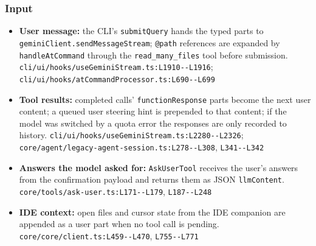 \subsubsection*{Input}
\begin{itemize}
\item \textbf{User message:} the CLI's \texttt{submitQuery} hands the typed parts to \texttt{geminiClient.\allowbreak{}sendMessageStream}; \texttt{@path} references are expanded by \texttt{handleAtCommand} through the \texttt{read\_\allowbreak{}many\_\allowbreak{}files} tool before submission. \texttt{cli/\allowbreak{}ui/\allowbreak{}hooks/\allowbreak{}useGeminiStream.\allowbreak{}ts:\allowbreak{}L1910-\allowbreak{}-\allowbreak{}L1916}; \texttt{cli/\allowbreak{}ui/\allowbreak{}hooks/\allowbreak{}atCommandProcessor.\allowbreak{}ts:\allowbreak{}L690-\allowbreak{}-\allowbreak{}L699}
\item \textbf{Tool results:} completed calls' \texttt{functionResponse} parts become the next user content; a queued user steering hint is prepended to that content; if the model was switched by a quota error the responses are only recorded to history. \texttt{cli/\allowbreak{}ui/\allowbreak{}hooks/\allowbreak{}useGeminiStream.\allowbreak{}ts:\allowbreak{}L2280-\allowbreak{}-\allowbreak{}L2326}; \texttt{core/\allowbreak{}agent/\allowbreak{}legacy-\allowbreak{}agent-\allowbreak{}session.\allowbreak{}ts:\allowbreak{}L278-\allowbreak{}-\allowbreak{}L308}, \texttt{L341-\allowbreak{}-\allowbreak{}L342}
\item \textbf{Answers the model asked for:} \texttt{AskUserTool} receives the user's answers from the confirmation payload and returns them as JSON \texttt{llmContent}. \texttt{core/\allowbreak{}tools/\allowbreak{}ask-\allowbreak{}user.\allowbreak{}ts:\allowbreak{}L171-\allowbreak{}-\allowbreak{}L179}, \texttt{L187-\allowbreak{}-\allowbreak{}L248}
\item \textbf{IDE context:} open files and cursor state from the IDE companion are appended as a user part when no tool call is pending. \texttt{core/\allowbreak{}core/\allowbreak{}client.\allowbreak{}ts:\allowbreak{}L459-\allowbreak{}-\allowbreak{}L470}, \texttt{L755-\allowbreak{}-\allowbreak{}L771}
\end{itemize}

